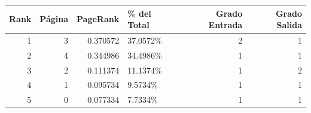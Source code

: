\begin{tabular}{rrrlrr}
\toprule
   Rank &   Página &   PageRank & \% del Total   &   Grado Entrada &   Grado Salida \\
\midrule
      1 &        3 &   0.370572 & 37.0572\%      &               2 &              1 \\
      2 &        4 &   0.344986 & 34.4986\%      &               1 &              1 \\
      3 &        2 &   0.111374 & 11.1374\%      &               1 &              2 \\
      4 &        1 &   0.095734 & 9.5734\%       &               1 &              1 \\
      5 &        0 &   0.077334 & 7.7334\%       &               1 &              1 \\
\bottomrule
\end{tabular}